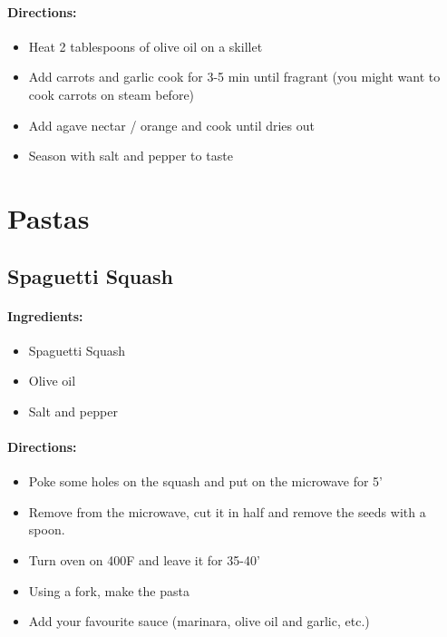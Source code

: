 \documentclass{article}
\begin{document}
\paragraph{Directions:}
\begin{itemize}
	\item  Heat 2 tablespoons of olive oil on a skillet
	\item Add carrots and garlic cook for 3-5 min until fragrant (you might want to cook carrots on steam before)
	\item Add agave nectar / orange and cook until dries out
	\item Season with salt and pepper to taste
\end{itemize}

\section{Pastas}

\subsection{Spaguetti Squash}

\paragraph{Ingredients:}

\begin{itemize}
	\item Spaguetti Squash
	\item Olive oil
	\item Salt and pepper
	
\end{itemize}

\paragraph{Directions:}
\begin{itemize}
	\item Poke some holes on the squash and put on the microwave for 5'
	\item Remove from the microwave, cut it in half and remove the seeds with a spoon.
	\item Turn oven on 400F and leave it for 35-40'
	\item Using a fork, make the pasta
	\item Add your favourite sauce (marinara, olive oil and garlic, etc.)
\end{itemize}
\end{document}
